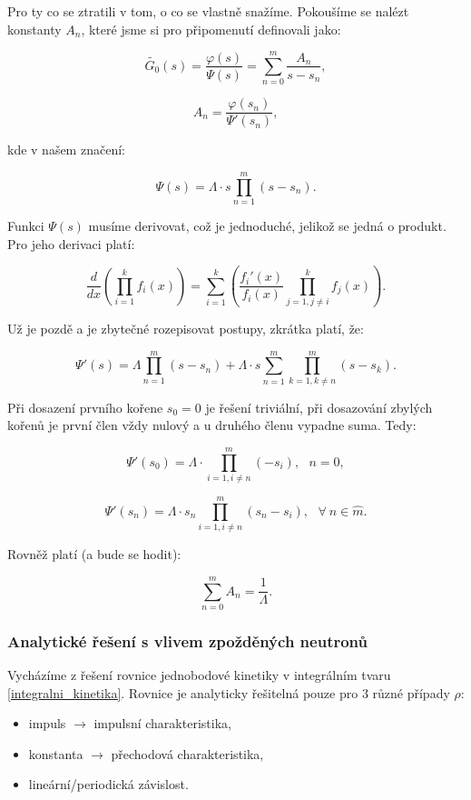 Pro ty co se ztratili v tom, o co se vlastně snažíme. Pokoušíme se nalézt konstanty $A_n$, které jsme si pro připomenutí definovali jako:

$$ \tilde{G_0}(s) = \dfrac{\varphi(s)}{\Psi(s)} = \sum_{n=0}^m \dfrac{A_n}{s-s_n}, $$

$$ A_n = \dfrac{\varphi(s_n)}{\Psi'(s_n)}, $$

kde v našem značení:

$$ \Psi(s) = \Lambda \cdot s \prod_{n=1}^m (s-s_n). $$

Funkci $\Psi(s)$ musíme derivovat, což je jednoduché, jelikož se jedná o produkt. Pro jeho derivaci platí:

$$ \dfrac{d}{dx} \left ( \prod_{i=1}^k f_i(x) \right ) = \sum_{i=1}^k \left ( \dfrac{f_i'(x)}{f_i(x)} \prod_{j=1,j \neq i}^k f_j(x) \right ). $$

Už je pozdě a je zbytečné rozepisovat postupy, zkrátka platí, že:

$$ \Psi'(s) = \Lambda \prod_{n=1}^m (s-s_n) + \Lambda \cdot s \sum_{n=1}^m \prod_{k=1, k \neq n}^m (s-s_k). $$

Při dosazení prvního kořene $s_0 = 0$ je řešení triviální, při dosazování zbylých kořenů je první člen vždy nulový a u druhého členu vypadne suma. Tedy:

$$ \Psi'(s_0) = \Lambda \cdot \prod_{i=1, i \neq n}^m (-s_i), \: \: \: n = 0, $$

$$ \Psi'(s_n) = \Lambda \cdot s_n \prod_{i=1, i \neq n}^m (s_n-s_i), \: \: \: \forall \: n \in \widehat{m}. $$

\normalsize

Rovněž platí (a bude se hodit):

$$ \sum_{n=0}^m A_n = \dfrac{1}{\Lambda}. $$

\subsubsection{Analytické řešení s vlivem zpožděných neutronů}

Vycházíme z řešení rovnice jednobodové kinetiky v integrálním tvaru \eqref{integralni_kinetika}. Rovnice je analyticky řešitelná pouze pro 3 různé případy $\rho$:

\begin{itemize}
  \item impuls $\rightarrow$ impulsní charakteristika,
  \item konstanta $\rightarrow$ přechodová charakteristika,
  \item lineární/periodická závislost.
\end{itemize}

